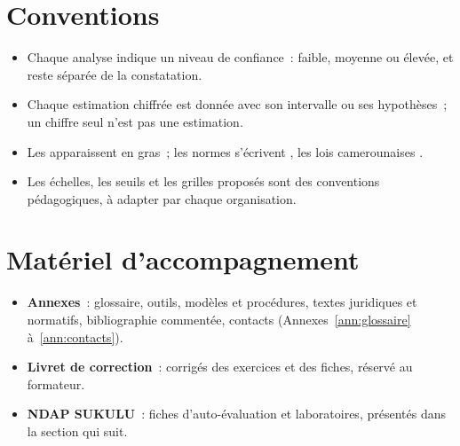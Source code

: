 \section*{Conventions}

\begin{itemize}
    \item Chaque analyse indique un niveau de confiance~: faible, moyenne ou
          élevée, et reste séparée de la constatation.
    \item Chaque estimation chiffrée est donnée avec son intervalle ou ses
          hypothèses~; un chiffre seul n'est pas une estimation.
    \item Les  apparaissent en gras~; les normes
          s'écrivent , les lois camerounaises
          .
    \item Les échelles, les seuils et les grilles proposés sont des
          conventions pédagogiques, à adapter par chaque organisation.
\end{itemize}

\section*{Matériel d'accompagnement}

\begin{itemize}
    \item \textbf{Annexes}~: glossaire, outils, modèles et procédures,
          textes juridiques et normatifs, bibliographie commentée, contacts
          (Annexes~\ref{ann:glossaire} à~\ref{ann:contacts}).
    \item \textbf{Livret de correction}~: corrigés des exercices et des
          fiches, réservé au formateur.
    \item \textbf{NDAP SUKULU}~: fiches d'auto-évaluation et laboratoires,
          présentés dans la section qui suit.
\end{itemize}
